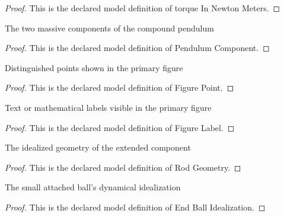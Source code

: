 \begin{proof}
  This is the declared model definition of torque In Newton Meters.
\end{proof}
\begin{definition}
  \label{def:physics:phyx-mini-0229:phyxminiproblems-problemphyxmini0229-pendulumcomponent}
  The two massive components of the compound pendulum
\end{definition}
\begin{proof}
  This is the declared model definition of Pendulum Component.
\end{proof}
\begin{definition}
  \label{def:physics:phyx-mini-0229:phyxminiproblems-problemphyxmini0229-figurepoint}
  Distinguished points shown in the primary figure
\end{definition}
\begin{proof}
  This is the declared model definition of Figure Point.
\end{proof}
\begin{definition}
  \label{def:physics:phyx-mini-0229:phyxminiproblems-problemphyxmini0229-figurelabel}
  Text or mathematical labels visible in the primary figure
\end{definition}
\begin{proof}
  This is the declared model definition of Figure Label.
\end{proof}
\begin{definition}
  \label{def:physics:phyx-mini-0229:phyxminiproblems-problemphyxmini0229-rodgeometry}
  The idealized geometry of the extended component
\end{definition}
\begin{proof}
  This is the declared model definition of Rod Geometry.
\end{proof}
\begin{definition}
  \label{def:physics:phyx-mini-0229:phyxminiproblems-problemphyxmini0229-endballidealization}
  The small attached ball's dynamical idealization
\end{definition}
\begin{proof}
  This is the declared model definition of End Ball Idealization.
\end{proof}
